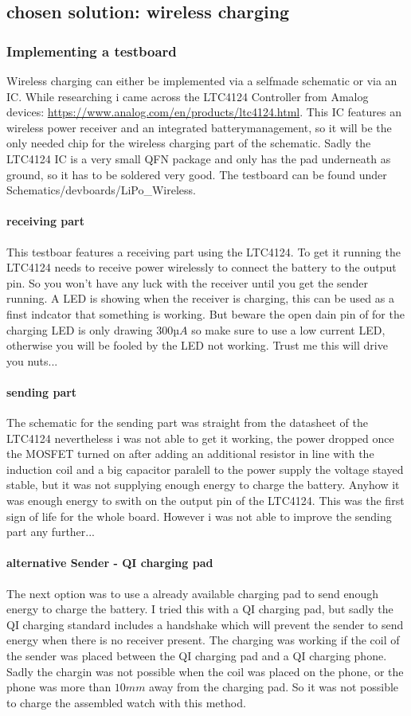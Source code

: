 \subsection{chosen solution: wireless charging}
\subsubsection{Implementing a testboard}
Wireless charging can either be implemented via a selfmade schematic or via an IC. While researching i came across the LTC4124 Controller from Amalog devices: \url{https://www.analog.com/en/products/ltc4124.html}. This IC features an wireless power receiver and an integrated batterymanagement, so it will be the only needed chip for the wireless charging part of the schematic.
Sadly the LTC4124 IC is a very small QFN package and only has the pad underneath as ground, so it has to be soldered very good.
The testboard can be found under Schematics/devboards/LiPo\_Wireless.
\paragraph{receiving part}
This testboar features a receiving part using the LTC4124. To get it running the LTC4124 needs to receive power wirelessly to connect the battery to the output pin. So you won't have any luck with the receiver until you get the sender running. 
A LED is showing when the receiver is charging, this can be used as a finst indcator that something is working. But beware the open dain pin of for the charging LED is only drawing $300µA$ so make sure to use a low current LED, otherwise you will be fooled by the LED not working. Trust me this will drive you nuts...
\paragraph{sending part}
The schematic for the sending part was straight from the datasheet of the LTC4124 nevertheless i was not able to get it working, the power dropped once the MOSFET turned on
after adding an additional resistor in line with the induction coil and a big capacitor paralell to the power supply the voltage stayed stable, but it was not supplying enough energy to charge the battery. Anyhow it was enough energy to swith on the output pin of the LTC4124. This was the first sign of life for the whole board. 
However i was not able to improve the sending part any further...
\paragraph{alternative Sender - QI charging pad}
The next option was to use a already available charging pad to send enough energy to charge the battery. I tried this with a QI charging pad, but sadly the QI charging standard includes a handshake which will prevent the sender to send energy when there is no receiver present.
The charging was working if the coil of the sender was placed between the QI charging pad and a QI charging phone.
Sadly the chargin was not possible when the coil was placed on the phone, or the phone was more than $10mm$ away from the charging pad. So it was not possible to charge the assembled watch with this method.
